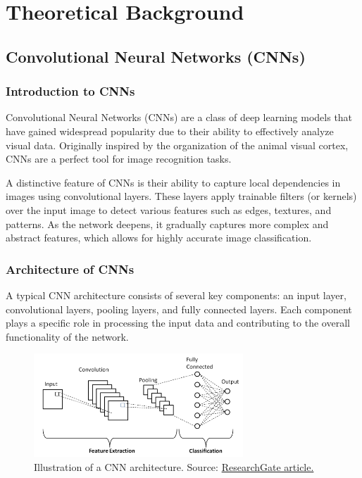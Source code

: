 \chapter{Theoretical Background}

\section{Convolutional Neural Networks (CNNs)}

\subsection{Introduction to CNNs}

Convolutional Neural Networks (CNNs) are a class of deep learning models that have gained widespread popularity due to their ability to effectively analyze visual data. Originally inspired by the organization of the animal visual cortex, CNNs are a perfect tool for image recognition tasks.

A distinctive feature of CNNs is their ability to capture local dependencies in images using convolutional layers. These layers apply trainable filters (or kernels) over the input image to detect various features such as edges, textures, and patterns. As the network deepens, it gradually captures more complex and abstract features, which allows for highly accurate image classification.

\subsection{Architecture of CNNs}

A typical CNN architecture consists of several key components: an input layer, convolutional layers, pooling layers, and fully connected layers. Each component plays a specific role in processing the input data and contributing to the overall functionality of the network.

\begin{figure}[h]
    \centering
    \includegraphics[width=0.7\textwidth]{img/cnn-architecture.png}
    \caption{Illustration of a CNN architecture. Source: \href{https://www.researchgate.net/publication/336805909_A_High-Accuracy_Model_Average_Ensemble_of_Convolutional_Neural_Networks_for_Classification_of_Cloud_Image_Patches_on_Small_Datasets}{ResearchGate article.}}
    \label{fig:cnn-architecture}
\end{figure}

